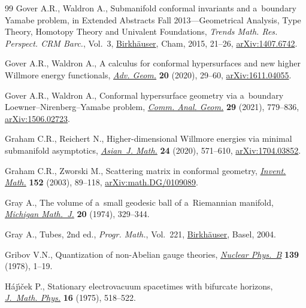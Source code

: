\documentclass[pdftex]{sigma}
\numberwithin{equation}{section}
\renewcommand{\=}{\stackrel \Lambda =}
\begin{document}
\begin{thebibliography}{99}
Gover A.R., Waldron A., Submanifold conformal invariants and a~boundary
 {Y}amabe problem, in Extended Abstracts {F}all 2013---Geometrical Analysis,
 Type Theory, Homotopy Theory and Univalent Foundations, \textit{Trends Math.
 Res. Perspect. CRM Barc.}, Vol.~3, \href{https://doi.org/10.1007/978-3-319-21284-5_4}{Birkh\"auser}, Cham, 2015, 21--26,
 \href{https://arxiv.org/abs/1407.6742}{arXiv:1407.6742}.

Gover A.R., Waldron A., A calculus for conformal hypersurfaces and new higher
 {W}illmore energy functionals, \href{https://doi.org/10.1515/advgeom-2019-0016}{\textit{Adv. Geom.}} \textbf{20} (2020),
 29--60, \href{https://arxiv.org/abs/1611.04055}{arXiv:1611.04055}.

Gover A.R., Waldron A., Conformal hypersurface geometry via a~boundary
 {L}oewner--{N}irenberg--{Y}amabe problem, \href{https://doi.org/10.4310/CAG.2021.v29.n4.a2}{\textit{Comm. Anal. Geom.}}
 \textbf{29} (2021), 779--836, \href{https://arxiv.org/abs/1506.02723}{arXiv:1506.02723}.

Graham C.R., Reichert N., Higher-dimensional {W}illmore energies via minimal
 submanifold asymptotics, \href{https://doi.org/10.4310/AJM.2020.v24.n4.a3}{\textit{Asian~J. Math.}} \textbf{24} (2020),
 571--610, \href{https://arxiv.org/abs/1704.03852}{arXiv:1704.03852}.

Graham C.R., Zworski M., Scattering matrix in conformal geometry,
 \href{https://doi.org/10.1007/s00222-002-0268-1}{\textit{Invent. Math.}} \textbf{152} (2003), 89--118,
 \href{https://arxiv.org/abs/math.DG/0109089}{arXiv:math.DG/0109089}.

Gray A., The volume of a~small geodesic ball of a~{R}iemannian manifold,
 \href{https://doi.org/10.1307/mmj/1029001150}{\textit{Michigan Math.~J.}} \textbf{20} (1974), 329--344.

Gray A., Tubes, 2nd ed., \textit{Progr. Math.}, Vol.~221, \href{https://doi.org/10.1007/978-3-0348-7966-8}{Birkh\"auser}, Basel,
 2004.

Gribov V.N., Quantization of non-{A}belian gauge theories, \href{https://doi.org/10.1016/0550-3213(78)90175-X}{\textit{Nuclear
 Phys.~B}} \textbf{139} (1978), 1--19.

H\'aj{\'\i}{\v{c}}ek P., Stationary electrovacuum spacetimes with bifurcate
 horizons, \href{https://doi.org/10.1063/1.522575}{\textit{J.~Math. Phys.}} \textbf{16} (1975), 518--522.


\end{thebibliography}
\end{document}
